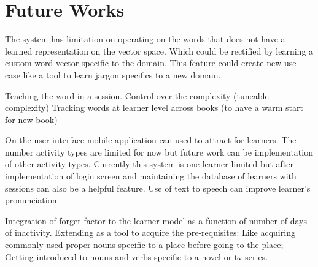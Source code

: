 \documentclass[11pt,a4paper]{article}
\begin{document}
\section{Future Works}
The system has limitation on operating on the words that does not have a learned
representation on the vector space. Which could be rectified by learning a
custom word vector specific to the domain. This feature could create new use case
like a tool to learn jargon specifics to a new domain.

Teaching the word in a session.
Control over the complexity (tuneable complexity)
Tracking words at learner level across books (to have a warm start for new book)

On the user interface mobile application can used to attract for learners. The number activity types are limited for now but future work can be implementation of other activity types. Currently this system is one learner limited but after implementation of login screen and maintaining the database of learners with sessions can also be a helpful feature. Use of text to speech can improve learner's pronunciation. 

Integration of forget factor to the learner model as a function of number of days of inactivity.
Extending as a tool to acquire the pre-requisites: Like acquiring commonly used proper nouns specific to a place before going to the place; Getting introduced to nouns and verbs specific to a novel or tv series.




\end{document}
